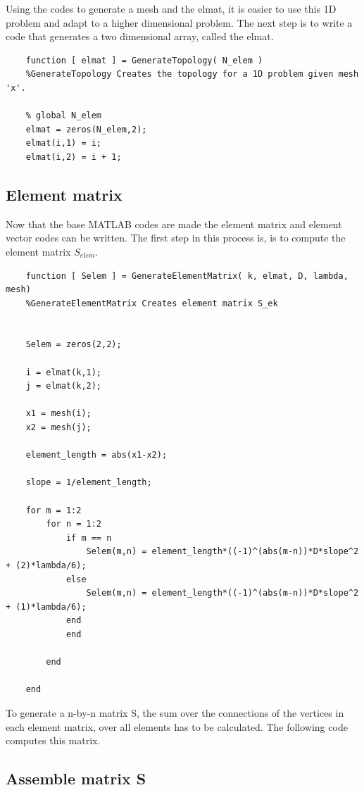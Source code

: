 \documentclass{report}
\begin{document}
Using the codes to generate a mesh and the elmat, it is easier to use this 1D problem and adapt to a higher dimensional problem. The next step is to write a code that generates a two dimensional array, called the elmat.

\begin{lstlisting}
	function [ elmat ] = GenerateTopology( N_elem )
	%GenerateTopology Creates the topology for a 1D problem given mesh 'x'.
	
	% global N_elem
	elmat = zeros(N_elem,2);
	elmat(i,1) = i;
	elmat(i,2) = i + 1;

\end{lstlisting}

\subsection{Element matrix}

Now that the base MATLAB codes are made the element matrix and element vector codes can be written. The first step in this process is, is to compute the element matrix $S_{elem}$.

\begin{lstlisting}
	function [ Selem ] = GenerateElementMatrix( k, elmat, D, lambda, mesh)
	%GenerateElementMatrix Creates element matrix S_ek
	
	
	Selem = zeros(2,2);
	
	i = elmat(k,1);
	j = elmat(k,2);
	
	x1 = mesh(i);
	x2 = mesh(j);
	
	element_length = abs(x1-x2);
	
	slope = 1/element_length; 
	
	for m = 1:2
		for n = 1:2
			if m == n
				Selem(m,n) = element_length*((-1)^(abs(m-n))*D*slope^2 + (2)*lambda/6);
			else
				Selem(m,n) = element_length*((-1)^(abs(m-n))*D*slope^2 + (1)*lambda/6);
			end
			end
	
		end
	
	end
\end{lstlisting}

\bigskip

To generate a n-by-n matrix S, the sum over the connections of the vertices in each element matrix, over all elements has to be calculated. The following code computes this matrix.


\subsection{Assemble matrix S}
\end{document}
